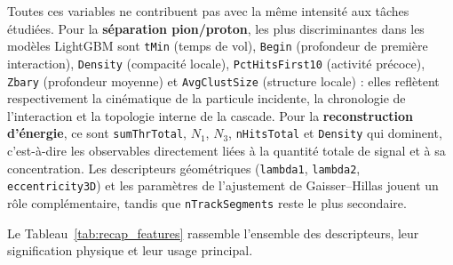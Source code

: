 Toutes ces variables ne contribuent pas avec la même intensité aux tâches étudiées. Pour la
\textbf{séparation pion/proton}, les plus discriminantes dans les modèles LightGBM sont
\texttt{tMin} (temps de vol), \texttt{Begin} (profondeur de première interaction),
\texttt{Density} (compacité locale), \texttt{PctHitsFirst10} (activité précoce), \texttt{Zbary}
(profondeur moyenne) et \texttt{AvgClustSize} (structure locale) : elles reflètent respectivement la
cinématique de la particule incidente, la chronologie de l'interaction et la topologie interne de la
cascade. Pour la \textbf{reconstruction d'énergie}, ce sont \texttt{sumThrTotal}, \(N_1\), \(N_3\),
\texttt{nHitsTotal} et \texttt{Density} qui dominent, c'est-à-dire les observables directement liées
à la quantité totale de signal et à sa concentration. Les descripteurs géométriques
(\texttt{lambda1}, \texttt{lambda2}, \texttt{eccentricity3D}) et les paramètres de l'ajustement de
Gaisser--Hillas jouent un rôle complémentaire, tandis que \texttt{nTrackSegments} reste le plus
secondaire.

Le Tableau~\ref{tab:recap_features} rassemble l'ensemble des descripteurs, leur signification
physique et leur usage principal.

\label{annexe:tableau_recap}

